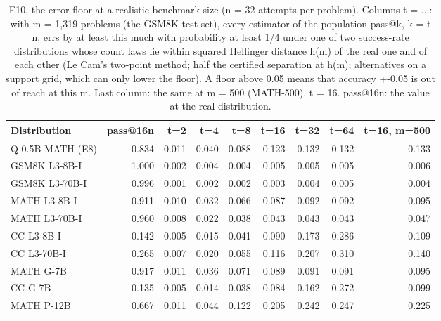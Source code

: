 \begin{table}[t]
\centering
\small
\begin{tabular}{lrrrrrrrr}
\toprule
Distribution & pass@16n & t=2 & t=4 & t=8 & t=16 & t=32 & t=64 & t=16, m=500 \\
\midrule
Q-0.5B MATH (E8) & 0.834 & 0.011 & 0.040 & 0.088 & 0.123 & 0.132 & 0.132 & 0.133 \\
GSM8K L3-8B-I & 1.000 & 0.002 & 0.004 & 0.004 & 0.005 & 0.005 & 0.005 & 0.006 \\
GSM8K L3-70B-I & 0.996 & 0.001 & 0.002 & 0.002 & 0.003 & 0.004 & 0.005 & 0.004 \\
MATH L3-8B-I & 0.911 & 0.010 & 0.032 & 0.066 & 0.087 & 0.092 & 0.092 & 0.095 \\
MATH L3-70B-I & 0.960 & 0.008 & 0.022 & 0.038 & 0.043 & 0.043 & 0.043 & 0.047 \\
CC L3-8B-I & 0.142 & 0.005 & 0.015 & 0.041 & 0.090 & 0.173 & 0.286 & 0.109 \\
CC L3-70B-I & 0.265 & 0.007 & 0.020 & 0.055 & 0.116 & 0.207 & 0.310 & 0.140 \\
MATH G-7B & 0.917 & 0.011 & 0.036 & 0.071 & 0.089 & 0.091 & 0.091 & 0.095 \\
CC G-7B & 0.135 & 0.005 & 0.014 & 0.038 & 0.084 & 0.162 & 0.272 & 0.099 \\
MATH P-12B & 0.667 & 0.011 & 0.044 & 0.122 & 0.205 & 0.242 & 0.247 & 0.225 \\
\bottomrule
\end{tabular}
\caption{E10, the error floor at a realistic benchmark size (n = 32 attempts per problem). Columns t = ...: with m = 1,319 problems (the GSM8K test set), every estimator of the population pass@k, k = t n, errs by at least this much with probability at least 1/4 under one of two success-rate distributions whose count laws lie within squared Hellinger distance h(m) of the real one and of each other (Le Cam's two-point method; half the certified separation at h(m); alternatives on a support grid, which can only lower the floor). A floor above 0.05 means that accuracy +-0.05 is out of reach at this m. Last column: the same at m = 500 (MATH-500), t = 16. pass@16n: the value at the real distribution.}
\label{tab:T19_error_floor_realistic_m}
\end{table}
